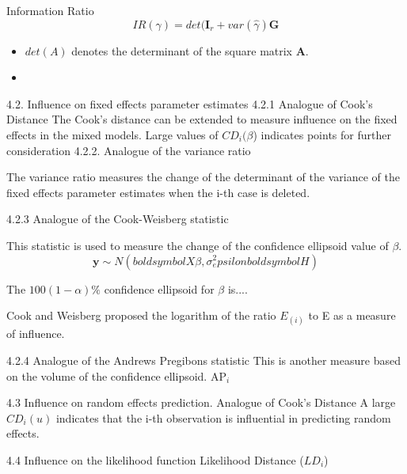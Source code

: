 \documentclass[12pt, a4paper]{article}
\begin{document}
Information Ratio
\[ IR(\gamma) = det( \boldsymbol{I}_r + var(\hat{\gamma})\boldsymbol{G} \]

\begin{itemize}
\item $det(A)$ denotes the determinant of the square matrix $\boldsymbol{A}$.
\item
\end{itemize}

4.2. Influence on fixed effects parameter estimates
4.2.1 Analogue of Cook’s Distance
The Cook’s distance can be extended to measure influence on the fixed effects in the mixed models.
Large values of $CD_i(\beta$) indicates points for further consideration
4.2.2. Analogue of the variance ratio

The variance ratio measures the change of the determinant of the variance of the fixed effects parameter estimates when the i-th case is deleted.

4.2.3 Analogue of the Cook-Weisberg statistic

This statistic is used to measure the change of the confidence ellipsoid value of $\beta$.
\[ \boldsymbol{y} \sim N ( boldsymbol{X}\beta , \sigma^2_epsilon boldsymbol{H})\]

The $100(1-\alpha)\%$ confidence ellipsoid for $\beta$ is....

Cook and Weisberg proposed the logarithm of the ratio $E_{(i)}$ to E as a measure of influence.




4.2.4 Analogue of the Andrews Pregibons statistic
This is another measure based on the volume of the confidence ellipsoid. AP$_i$

4.3 Influence on random effects prediction.
Analogue of Cook’s Distance
A large $CD_i(u)$ indicates that the i-th observation is influential in predicting random effects.

4.4 Influence on the likelihood function
Likelihood Distance ($LD_i$)
\end{document}

